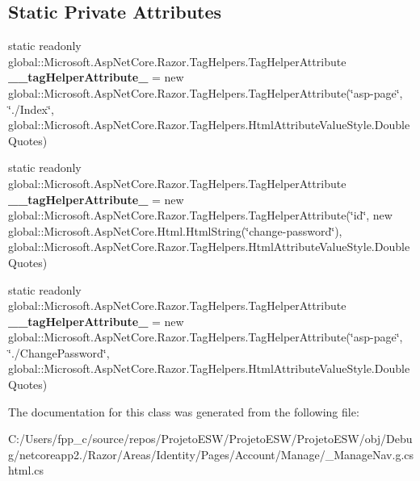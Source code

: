 \subsection*{Static Private Attributes}
\begin{DoxyCompactItemize}
\item 
\mbox{\label{class_projeto_e_s_w_1_1_areas_1_1_identity_1_1_pages_1_1_account_1_1_manage_1_1_areas___identity9df048355e46256b00c921251d1ec8a1_a013eca33939046c8e4ea11653a23bb74}} 
static readonly global\+::\+Microsoft.\+Asp\+Net\+Core.\+Razor.\+Tag\+Helpers.\+Tag\+Helper\+Attribute {\bfseries \+\_\+\+\_\+tag\+Helper\+Attribute\+\_} = new global\+::\+Microsoft.\+Asp\+Net\+Core.\+Razor.\+Tag\+Helpers.\+Tag\+Helper\+Attribute(\char`\"{}asp-\/page\char`\"{}, \char`\"{}./Index\char`\"{}, global\+::\+Microsoft.\+Asp\+Net\+Core.\+Razor.\+Tag\+Helpers.\+Html\+Attribute\+Value\+Style.\+Double\+Quotes)
\item 
\mbox{\label{class_projeto_e_s_w_1_1_areas_1_1_identity_1_1_pages_1_1_account_1_1_manage_1_1_areas___identity9df048355e46256b00c921251d1ec8a1_afd4593eb7b6280c90727160e0cae7789}} 
static readonly global\+::\+Microsoft.\+Asp\+Net\+Core.\+Razor.\+Tag\+Helpers.\+Tag\+Helper\+Attribute {\bfseries \+\_\+\+\_\+tag\+Helper\+Attribute\+\_} = new global\+::\+Microsoft.\+Asp\+Net\+Core.\+Razor.\+Tag\+Helpers.\+Tag\+Helper\+Attribute(\char`\"{}id\char`\"{}, new global\+::\+Microsoft.\+Asp\+Net\+Core.\+Html.\+Html\+String(\char`\"{}change-\/password\char`\"{}), global\+::\+Microsoft.\+Asp\+Net\+Core.\+Razor.\+Tag\+Helpers.\+Html\+Attribute\+Value\+Style.\+Double\+Quotes)
\item 
\mbox{\label{class_projeto_e_s_w_1_1_areas_1_1_identity_1_1_pages_1_1_account_1_1_manage_1_1_areas___identity9df048355e46256b00c921251d1ec8a1_a3dba53d450cba8d863eb32c866e3a6da}} 
static readonly global\+::\+Microsoft.\+Asp\+Net\+Core.\+Razor.\+Tag\+Helpers.\+Tag\+Helper\+Attribute {\bfseries \+\_\+\+\_\+tag\+Helper\+Attribute\+\_} = new global\+::\+Microsoft.\+Asp\+Net\+Core.\+Razor.\+Tag\+Helpers.\+Tag\+Helper\+Attribute(\char`\"{}asp-\/page\char`\"{}, \char`\"{}./Change\+Password\char`\"{}, global\+::\+Microsoft.\+Asp\+Net\+Core.\+Razor.\+Tag\+Helpers.\+Html\+Attribute\+Value\+Style.\+Double\+Quotes)
\end{DoxyCompactItemize}


The documentation for this class was generated from the following file\+:\begin{DoxyCompactItemize}
\item 
C\+:/\+Users/fpp\+\_\+c/source/repos/\+Projeto\+E\+S\+W/\+Projeto\+E\+S\+W/\+Projeto\+E\+S\+W/obj/\+Debug/netcoreapp2./\+Razor/\+Areas/\+Identity/\+Pages/\+Account/\+Manage/\+\_\+\+Manage\+Nav.\+g.\+cshtml.\+cs\end{DoxyCompactItemize}
